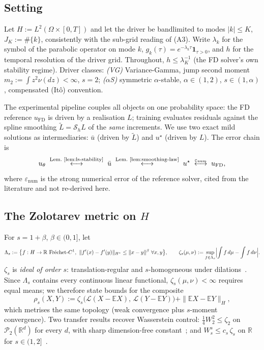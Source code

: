 \documentclass[review,12pt]{elsarticle}
\begin{document}
\subsection{Setting}

Let $H := L^2(\Omega \times [0,T])$ and let the driver be bandlimited
to modes $|k| \le K$, $J_K := \#\{k\}$, consistently with the sub-grid
reading of (A3). Write $\lambda_k$ for the symbol of the parabolic
operator on mode $k$, $g_k(\tau) = e^{-\lambda_k\tau}\mathbf 1_{\tau>0}$,
and $h$ for the temporal resolution of the driver grid. Throughout,
$h \le \lambda_K^{-1}$ (the FD solver's own stability regime). Driver
classes: \emph{(VG)} Variance-Gamma, jump second moment
$m_2 := \int z^2\nu(dz) < \infty$, $s = 2$; \emph{($\alpha$S)}
symmetric $\alpha$-stable, $\alpha \in (1,2)$, $s \in (1,\alpha)$,
compensated (It\^o) convention.

The experimental pipeline couples all objects on one probability
space: the FD reference $u_{\mathrm{FD}}$ is driven by a realisation
$L$; training evaluates residuals against the spline smoothing
$\tilde L = \mathcal S_h L$ of the \emph{same} increments. We use two
exact mild solutions as intermediaries: $\bar u$ (driven by
$\tilde L$) and $u^\star$ (driven by $L$). The error chain is
\[
u_\theta
\;\overset{\text{Lem.~\ref{lem:ls-stability}}}{\longleftrightarrow}\;
\bar u
\;\overset{\text{Lem.~\ref{lem:smoothing-law}}}{\longleftrightarrow}\;
u^\star
\;\overset{\varepsilon_{\mathrm{num}}}{\longleftrightarrow}\;
u_{\mathrm{FD}},
\]
where $\varepsilon_{\mathrm{num}}$ is the strong numerical error of
the reference solver, cited from the literature
\cite{PeszatZabczyk2007} and not re-derived here.

\subsection{The Zolotarev metric on $H$}

For $s = 1 + \beta$, $\beta \in (0,1]$, let
\[
\Lambda_s := \bigl\{f : H \to \mathbb R \ \text{Fr\'echet-}C^1,\
\|f'(x) - f'(y)\|_{H^*} \le \|x-y\|^\beta \ \forall x, y\bigr\},
\qquad
\zeta_s(\mu,\nu) := \sup_{f \in \Lambda_s}
\Bigl|\int f\,d\mu - \int f\,d\nu\Bigr|.
\]
$\zeta_s$ is \emph{ideal of order $s$}: translation-regular and
$s$-homogeneous under dilations~\cite{Zolotarev1976}. Since
$\Lambda_s$ contains every continuous linear functional,
$\zeta_s(\mu,\nu) < \infty$ requires equal means; we therefore state
bounds for the composite
\[
\rho_s(X, Y) := \zeta_s\bigl(\mathcal L(X - \mathbb EX),\,
\mathcal L(Y - \mathbb EY)\bigr) + \|\mathbb EX - \mathbb EY\|_H,
\]
which metrises the same topology (weak convergence plus $s$-moment
convergence). Two transfer results recover Wasserstein control:
$\tfrac14 W_2^2 \le \zeta_2$ on $\mathcal P_2(\mathbb R^d)$ for every
$d$, with sharp dimension-free
constant~\cite[Thm.~3.1]{BolbotowskiBouchitte2025}; and
$W_s^s \le c_s\,\zeta_s$ on $\mathbb R$ for
$s \in (1,2]$~\cite{Rio2009}.
\end{document}
